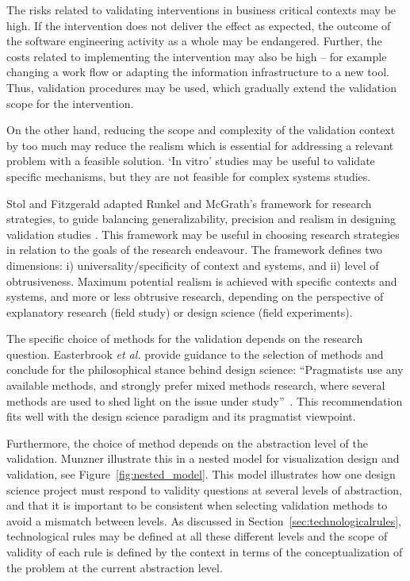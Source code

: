 \documentclass[graybox]{svmult}
\begin{document}
The risks related to validating interventions in business critical contexts may be high. If the intervention does not deliver the effect as expected, the outcome of the software engineering activity as a whole may be endangered. Further, the costs related to implementing the intervention may also be high -- for example changing a work flow or adapting the information infrastructure to a new tool. Thus, validation procedures may be used, which gradually extend the validation scope for the intervention.

On the other hand, reducing the scope and complexity of the validation context by too much may reduce the realism which is essential for addressing a relevant problem with a feasible solution. `In vitro' studies may be useful to validate specific mechanisms, but they are not feasible for complex systems studies.  

Stol and Fitzgerald adapted Runkel and McGrath's framework for research strategies, to guide balancing generalizability, precision and realism in designing validation studies \cite{StolABC18}. This framework may be useful in choosing research strategies in relation to the goals of the research endeavour. The framework defines two dimensions: i) universality/specificity of context and systems, and ii) level of obtrusiveness. Maximum potential realism is achieved with specific contexts and systems, and more or less obtrusive research, depending on the perspective of explanatory research (field study) or design science (field experiments).  

The specific choice of methods for the validation depends on the research question. Easterbrook \emph{et al.} provide guidance to the selection of methods and conclude for the philosophical stance behind design science: ``Pragmatists use any available methods, and strongly prefer mixed methods research, where several methods are used to shed light on the issue under study''~\cite{easterbrook_selecting_2008}. 
This recommendation fits well with the design science paradigm and its pragmatist viewpoint.

Furthermore, the choice of method depends on the abstraction level of the validation. Munzner illustrate this in a nested model for visualization design and validation, see Figure~\ref{fig:nested_model}. This model illustrates how one design science project must respond to validity questions at several levels of abstraction, and that it is important to be consistent when selecting validation methods to avoid a mismatch between levels. As discussed in Section~\ref{sec:technologicalrules}, technological rules may be defined at all these different levels and the scope of validity of each rule is defined by the context in terms of the conceptualization of the problem at the current abstraction level.
\end{document}
